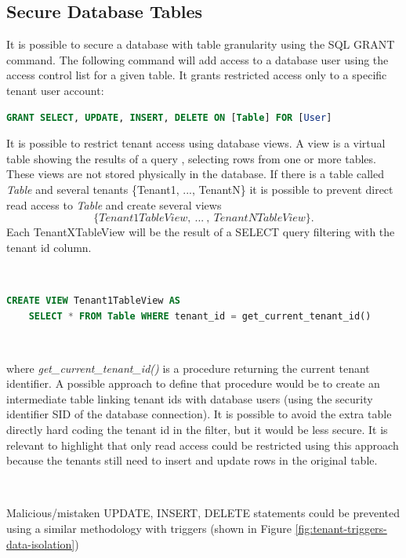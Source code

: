 \documentclass[12pt,english]{article} %
\begin{document}
\subsection{Secure Database Tables}
It is possible to secure a database with table granularity using the SQL GRANT command.
The following command will add access to a database user using the access control list for a given table.
It grants restricted access only to a specific tenant user account:
\begin{lstlisting}[language=sql,numbers=none]
GRANT SELECT, UPDATE, INSERT, DELETE ON [Table] FOR [User]
\end{lstlisting}

It is possible to restrict tenant access using database views.
A view is a virtual table showing the results of a query \cite{views-in-sql}, selecting rows from one or more tables. These views are not stored physically in the database.
If there is a table called \textit{Table} and several tenants \{Tenant1, ..., TenantN\} it is possible to prevent direct read access to \textit{Table} and create several views 
$$\{Tenant1TableView,\ ... \ ,\ TenantNTableView\}.$$
Each TenantXTableView will be the result of a SELECT query filtering with the tenant id column.

\

\begin{lstlisting}[language=sql,numbers=none]
CREATE VIEW Tenant1TableView AS
    SELECT * FROM Table WHERE tenant_id = get_current_tenant_id()
\end{lstlisting}

\

where \textit{get\_current\_tenant\_id()} is a procedure returning the current tenant identifier.
A possible approach to define that procedure would be to create an intermediate table linking tenant ids with database users (using the security identifier SID of the database connection).
It is possible to avoid the extra table directly hard coding the tenant id in the filter, but it would be less secure.
It is relevant to highlight that only read access could be restricted using this approach because the tenants still need to insert and update rows in the original table.

\ 

Malicious/mistaken UPDATE, INSERT, DELETE statements could be prevented using a similar methodology with triggers (shown in Figure \ref{fig:tenant-triggers-data-isolation})
\end{document}
